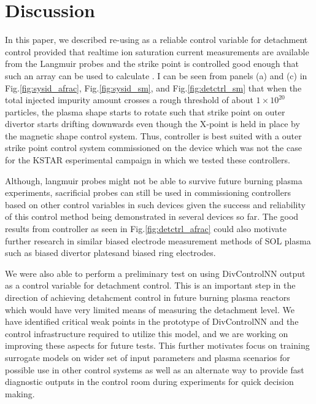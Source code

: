 \section{Discussion}
\label{sec:discussion}

In this paper, we described re-using \Afrac as a reliable control variable for detachment control provided that realtime ion saturation current measurements are available from the Langmuir probes and the strike point is controlled good enough that such an array can be used to calculate \Afrac. I can be seen from panels (a) and (c) in Fig.\ref{fig:sysid_afrac}, Fig.\ref{fig:sysid_sm}, and Fig.\ref{fig:detctrl_sm} that when the total injected impurity amount crosses a rough threshold of about $1\times10^{20}$ particles, the plasma shape starts to rotate such that strike point on outer divertor starts drifting downwards even though the X-point is held in place by the magnetic shape control system. Thus, \Afrac controller is best suited with a outer strike point control system commissioned on the device which was not the case for the KSTAR esperimental campaign in which we tested these controllers.

Although, langmuir probes might not be able to survive future burning plasma experiments, sacrificial probes can still be used in commissioning controllers based on other control variables in such devices given the success and reliability of this control method being demonstrated in several devices so far\needcite. The good results from \Afrac controller as seen in Fig.\ref{fig:detctrl_afrac} could also motivate further research in similar biased electrode measurement methods of SOL plasma such as biased divertor plates\needcite and biased ring electrodes\needcite.

We were also able to perform a preliminary test on using DivControlNN output as a control variable for detachment control. This is an important step in the direction of achieving detahcment control in future burning plasma reactors which would have very limited means of measuring the detachment level. We have identified critical weak points in the prototype of DivControlNN and the control infrastructure required to utilize this model, and we are working on improving these aspects for future tests. This further motivates focus on training surrogate models on wider set of input parameters and plasma scenarios for possible use in other control systems as well as an alternate way to provide fast diagnostic outputs in the control room during experiments for quick decision making.

